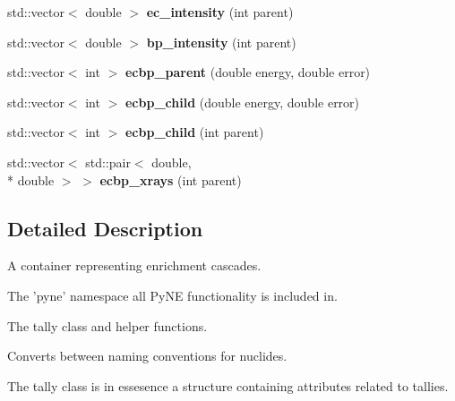 \begin{DoxyCompactItemize}
\item 
\hypertarget{namespacepyne_acdd99da92f821b3634d41c217f7ba36c}{std\+::vector$<$ double $>$ {\bfseries ec\+\_\+intensity} (int parent)}\label{namespacepyne_acdd99da92f821b3634d41c217f7ba36c}

\item 
\hypertarget{namespacepyne_ae90f342a67b82fd077368de131ad511f}{std\+::vector$<$ double $>$ {\bfseries bp\+\_\+intensity} (int parent)}\label{namespacepyne_ae90f342a67b82fd077368de131ad511f}

\item 
\hypertarget{namespacepyne_a02be9a4983e3e83032e61aa37477b10f}{std\+::vector$<$ int $>$ {\bfseries ecbp\+\_\+parent} (double energy, double error)}\label{namespacepyne_a02be9a4983e3e83032e61aa37477b10f}

\item 
\hypertarget{namespacepyne_ac59bf74785aa6b188506174de3b2ce53}{std\+::vector$<$ int $>$ {\bfseries ecbp\+\_\+child} (double energy, double error)}\label{namespacepyne_ac59bf74785aa6b188506174de3b2ce53}

\item 
\hypertarget{namespacepyne_a2262ce3daa576a7bd988583ee2e9cbca}{std\+::vector$<$ int $>$ {\bfseries ecbp\+\_\+child} (int parent)}\label{namespacepyne_a2262ce3daa576a7bd988583ee2e9cbca}

\item 
\hypertarget{namespacepyne_a2534b5faa411582a7b6829c9bd54224d}{std\+::vector$<$ std\+::pair$<$ double, \\*
double $>$ $>$ {\bfseries ecbp\+\_\+xrays} (int parent)}\label{namespacepyne_a2534b5faa411582a7b6829c9bd54224d}

\end{DoxyCompactItemize}


\subsection{Detailed Description}
A container representing enrichment cascades. 

The 'pyne' namespace all Py\+N\+E functionality is included in.

The tally class and helper functions.

Converts between naming conventions for nuclides.

The tally class is in essesence a structure containing attributes related to tallies. 

